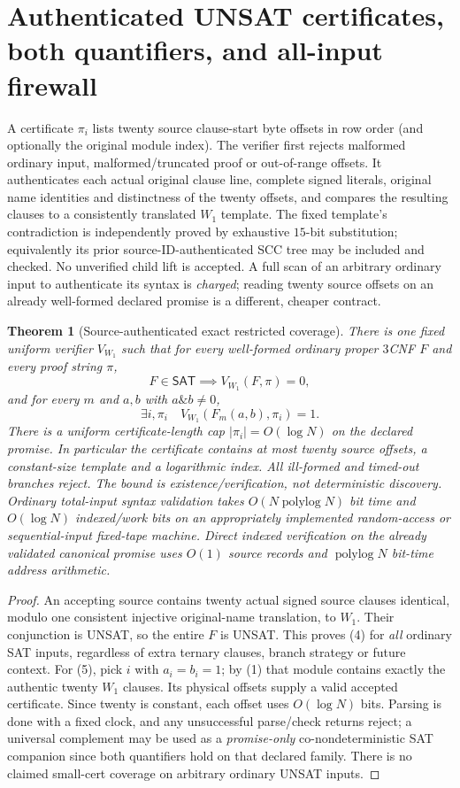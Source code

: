 \documentclass[11pt]{article}
\newtheorem{theorem}{Theorem}
\newcommand{\SAT}{\mathsf{SAT}}
\begin{document}
\section{Authenticated UNSAT certificates, both quantifiers, and all-input firewall}
A certificate $\pi_i$ lists twenty source clause-start byte offsets in row order (and optionally the original module index). The verifier first rejects malformed ordinary input, malformed/truncated proof or out-of-range offsets. It authenticates each actual original clause line, complete signed literals, original name identities and distinctness of the twenty offsets, and compares the resulting clauses to a consistently translated $W_1$ template. The fixed template's contradiction is independently proved by exhaustive $15$-bit substitution; equivalently its prior source-ID-authenticated SCC tree may be included and checked. No unverified child lift is accepted. A full scan of an arbitrary ordinary input to authenticate its syntax is \emph{charged}; reading twenty source offsets on an already well-formed declared promise is a different, cheaper contract.
\begin{theorem}[Source-authenticated exact restricted coverage]\label{th:cert}
There is one fixed uniform verifier $V_{W_1}$ such that for every well-formed ordinary proper $3$CNF $F$ and every proof string $\pi$,
\[
F\in\SAT\implies V_{W_1}(F,\pi)=0,\tag{4}
\]
and for every $m$ and $a,b$ with $a\mathbin{\&}b\ne0$,
\[
\exists i,\pi_i\quad V_{W_1}(F_m(a,b),\pi_i)=1.\tag{5}
\]
There is a uniform certificate-length cap $|\pi_i|=O(\log N)$ on the declared promise. In particular the certificate contains at most twenty source offsets, a constant-size template and a logarithmic index. All ill-formed and timed-out branches reject. The bound is existence/verification, \emph{not deterministic discovery}. Ordinary total-input syntax validation takes $O(N\operatorname{polylog}N)$ bit time and $O(\log N)$ indexed/work bits on an appropriately implemented random-access or sequential-input fixed-tape machine. Direct indexed verification on the already validated canonical promise uses $O(1)$ source records and $\operatorname{polylog}N$ bit-time address arithmetic.
\end{theorem}
\begin{proof}
An accepting source contains twenty actual signed source clauses identical, modulo one consistent injective original-name translation, to $W_1$. Their conjunction is UNSAT, so the entire $F$ is UNSAT. This proves (4) for \emph{all} ordinary SAT inputs, regardless of extra ternary clauses, branch strategy or future context. For (5), pick $i$ with $a_i=b_i=1$; by (1) that module contains exactly the authentic twenty $W_1$ clauses. Its physical offsets supply a valid accepted certificate. Since twenty is constant, each offset uses $O(\log N)$ bits. Parsing is done with a fixed clock, and any unsuccessful parse/check returns reject; a universal complement may be used as a \emph{promise-only} co-nondeterministic SAT companion since both quantifiers hold on that declared family. There is no claimed small-cert coverage on arbitrary ordinary UNSAT inputs.
\end{proof}
\end{document}
